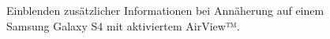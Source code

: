 \documentclass[a4paper,12pt,bibliography=totoc]{scrreprt}%
\begin{document}
\begin{figure}
\centering
{}
\hfill
{}
\caption{Einblenden zusätzlicher Informationen bei Annäherung auf einem Samsung Galaxy S4 mit aktiviertem AirView™.}
\label{samsungeinleitung2}
\end{figure}
\end{document}
